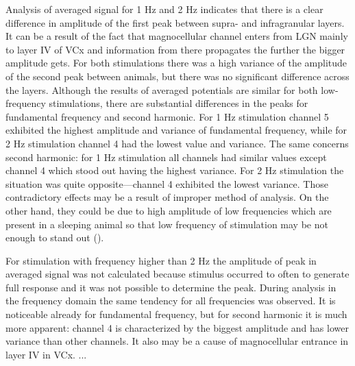 \documentclass{pracalicmgr}
\begin{document}
    Analysis of averaged signal for 1 Hz and 2 Hz indicates that there is a clear difference in amplitude of the first peak between supra- and infragranular layers. It can be a result of the fact that magnocellular channel enters from LGN mainly to layer IV of VCx and information from there propagates the further the bigger amplitude gets. For both stimulations there was a high variance of the amplitude of the second peak between animals, but there was no significant difference across the layers. Although the results of averaged potentials are similar for both low-frequency stimulations, there are substantial differences in the peaks for fundamental frequency and second harmonic. For 1 Hz stimulation channel 5 exhibited the highest amplitude and variance of fundamental frequency, while for 2 Hz stimulation channel 4 had the lowest value and variance. The same concerns second harmonic: for 1 Hz stimulation all channels had similar values except channel 4 which stood out having the highest variance. For 2 Hz stimulation the situation was quite opposite---channel 4 exhibited the lowest variance. Those contradictory effects may be a result of improper method of analysis. On the other hand, they could be due to high amplitude of low frequencies which are present in a sleeping animal so that low frequency of stimulation may be not enough to stand out (\cite{ja}).
    
    For stimulation with frequency higher than 2 Hz the amplitude of peak in averaged signal was not calculated because stimulus occurred to often to generate full response and it was not possible to determine the peak. During analysis in the frequency domain the same tendency for all frequencies was observed. It is noticeable already for fundamental frequency, but for second harmonic it is much more apparent: channel 4 is characterized by the biggest amplitude and has lower variance than other channels. It also may be a cause of magnocellular entrance in layer IV in VCx.
    ...
    

\printbibliography[heading=bibintoc]
\end{document}
